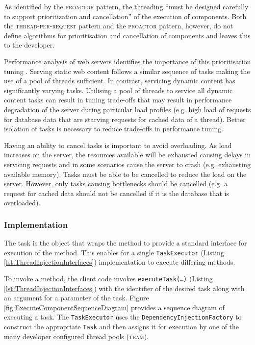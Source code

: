 \documentclass[prodmode]{style/acmlarge}
\begin{document}
As identified by the \textsc{proactor} pattern, the threading ``must be designed
carefully to support prioritization and cancellation'' \cite[p. 8]{proactor} of
the execution of components.  Both the \textsc{thread-per-request} pattern and
the \textsc{proactor} pattern, however, do not define algorithms for
prioritisation and cancellation of components and leaves this to the developer.

Performance analysis of web servers identifies the importance of this
prioritisation tuning
\cite{tuning-important,low-server-footprint,tuning-os-important}.
Serving static web content follows a similar sequence of tasks making the use of
a pool of threads sufficient.  In contrast, servicing dynamic content has
significantly varying tasks.  Utilising a pool of threads to service all dynamic
content tasks can result in tuning trade-offs that may result in performance
degradation of the server during particular load profiles (e.g. high load of
requests for database data that are starving requests for cached data of a
thread).  Better isolation of tasks is necessary to reduce trade-offs in
performance tuning.

Having an ability to cancel tasks is important to avoid overloading.  As
load increases on the server, the resources available will be exhausted causing
delays in servicing requests and in some scenarios cause the server to crash
(e.g. exhausting available memory).  Tasks must be able to be cancelled to
reduce the load on the server.  However, only tasks causing bottlenecks
should be cancelled (e.g. a request for cached data should not be cancelled if
it is the database that is overloaded).


\subsubsection*{Implementation}

The task is the object that wraps the method to provide a standard interface for
execution of the method.  This enables for a single \texttt{TaskExecutor}
(Listing \ref{lst:ThreadInjectionInterfaces}) implementation to execute
differing methods.

To invoke a method, the client code invokes \texttt{executeTask(\ldots)}
(Listing \ref{lst:ThreadInjectionInterfaces}) with the identifier of the desired
task along with an argument for a parameter of the task.  Figure
\ref{fig:ExecuteComponentSequenceDiagram} provides a sequence diagram of
executing a task.  The \texttt{TaskExecutor} uses the
\texttt{DependencyInjectionFactory} to construct the appropriate \texttt{Task}
and then assigns it for execution by one of the many developer configured thread
pools (\textsc{team}).
\end{document}
